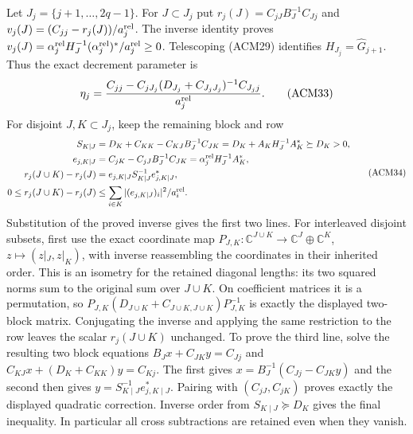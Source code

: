 Let $J_j=\{j+1,\ldots,2q-1\}$. For $J\subset J_j$ put
$r_j(J)=C_{jJ}B_J^{-1}C_{Jj}$ and
$v_j(J)=(C_{jj}-r_j(J))/a_j^{\rm rel}$.
The inverse identity proves
$v_j(J)=\alpha_j^{\rm rel}H_J^{-1}(\alpha_j^{\rm rel})^*/a_j^{\rm rel}
\geq0$. Telescoping (ACM29) identifies
$H_{J_j}=\widehat G_{j+1}$. Thus the exact decrement parameter is
\[
 \eta_j=
 \frac{C_{jj}-C_{jJ_j}(D_{J_j}+C_{J_jJ_j})^{-1}C_{J_jj}}
      {a_j^{\rm rel}}.
 \tag{ACM33}
\]
For disjoint $J,K\subset J_j$, keep the remaining block and row
\[
\begin{aligned}
 S_{K\mid J}&=D_K+C_{KK}-C_{KJ}B_J^{-1}C_{JK}
             =D_K+A_KH_J^{-1}A_K^*\succeq D_K>0,\\
 e_{j,K\mid J}&=C_{jK}-C_{jJ}B_J^{-1}C_{JK}
                =\alpha_j^{\rm rel}H_J^{-1}A_K^*,\\
 r_j(J\cup K)-r_j(J)&=e_{j,K\mid J}S_{K\mid J}^{-1}e_{j,K\mid J}^*,\\
 0\leq r_j(J\cup K)-r_j(J)
 &\leq\sum_{i\in K}|(e_{j,K\mid J})_i|^2/a_i^{\rm rel}.
\end{aligned}\tag{ACM34}
\]
Substitution of the proved inverse gives the first two lines.
For interleaved disjoint subsets, first use the exact coordinate map
$P_{J,K}:\mathbb C^{J\cup K}\to\mathbb C^J\oplus\mathbb C^K$,
$z\mapsto(z|_J,z|_K)$, with inverse reassembling the coordinates
in their inherited order. This is an isometry for the retained
diagonal lengths: its two squared norms sum to the original
sum over $J\cup K$. On coefficient matrices it is a permutation,
so $P_{J,K}(D_{J\cup K}+C_{J\cup K,J\cup K})P_{J,K}^{-1}$
is exactly the displayed two-block matrix. Conjugating the inverse
and applying the same restriction to the row leaves the scalar
$r_j(J\cup K)$ unchanged. To prove the third line, solve the
resulting two block equations
$B_Jx+C_{JK}y=C_{Jj}$ and
$C_{KJ}x+(D_K+C_{KK})y=C_{Kj}$.
The first gives $x=B_J^{-1}(C_{Jj}-C_{JK}y)$ and the second
then gives $y=S_{K\mid J}^{-1}e_{j,K\mid J}^*$.
Pairing with $(C_{jJ},C_{jK})$ proves exactly the displayed
quadratic correction. Inverse order from $S_{K\mid J}\succeq D_K$
gives the final inequality. In particular all cross subtractions
are retained even when they vanish.

